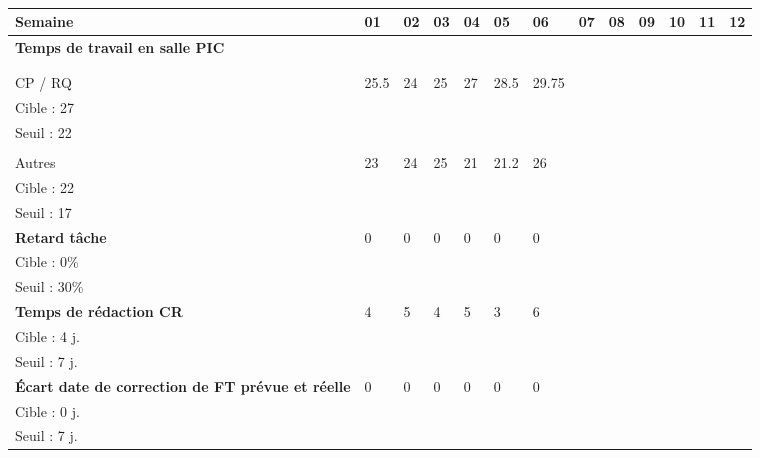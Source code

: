 \documentclass[asi,sansVersion]{picInsa}
\begin{document}
	\begin{landscape}
	\begin{center}
		\LARGE
		\textsc{
			\TB{}\\
		}
	\end{center}
	\vspace{0.5cm}


		\begin{longtable}{|p{2.2cm}|p{1cm}|p{1cm}|p{1cm}|p{1cm}|p{1cm}|p{1cm}|p{1cm}|p{1cm}|p{1cm}|p{1cm}|p{1cm}|p{1cm}|}
			\hline
			\rowcolor[gray]{0.85}
			Semaine & 01 & 02 & 03 & 04 & 05 & 06 & 07 & 08 & 09 & 10 & 11 & 12 \\\hline
			\textbf{Temps de travail en salle PIC} &  &  &  &  &  &  &  &  &  &  &  &\\ 
			&  &  &  &  &  &  &  &  &  &  &  &\\
			&  &  &  &  &  &  &  &  &  &  &  &\\
			CP / RQ & 25.5 & 24 & 25 & 27 & 28.5 & 29.75 &  &  &  &  &  &\\
			Cible : 27 &  &  &  &  &  &  &  &  &  &  &  &\\
			Seuil : 22 &  &  &  &  &  &  &  &  &  &  &  &\\
			&  &  &  &  &  &  &  &  &  &  &  &\\
			Autres & 23 & 24 & 25 & 21 & 21.2 & 26 &  &  &  &  &  &\\
			Cible : 22 &  &  &  &  &  &  &  &  &  &  &  &\\
			Seuil : 17 &  &  &  &  &  &  &  &  &  &  &  &\\\hline
			\textbf{Retard tâche} & 0 & 0 & 0 & 0 & 0 & 0 &  &  &  &  &  &\\
			Cible : 0\% &  &  &  &  &  &  &  &  &  &  &  &\\
			Seuil : 30\% &  &  &  &  &  &  &  &  &  &  &  &\\\hline
			\textbf{Temps de rédaction CR} & 4 & 5 & 4 & 5 & 3 & 6 &  &  &  &  &  &\\
			Cible : 4 j. &  &  &  &  &  &  &  &  &  &  &  &\\
			Seuil : 7 j. &  &  &  &  &  &  &  &  &  &  &  &\\\hline
			\textbf{Écart date de correction de FT prévue et réelle} & 0 & 0 & 0 & 0 & 0 & 0 &  &  &  &  &  &\\
			Cible : 0 j. &  &  &  &  &  &  &  &  &  &  &  &\\
			Seuil : 7 j. &  &  &  &  &  &  &  &  &  &  &  &\\\hline
			
		\end{longtable}
	\end{landscape}
\end{document}
